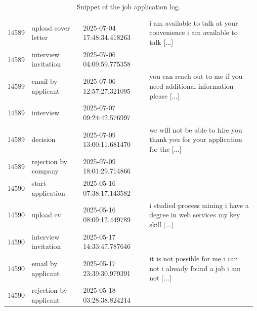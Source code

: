 \begin{appendices}
\begin{table}[!h]
\begin{tabularx}{\textwidth}{lllp{8.5cm}}
14589&upload cover letter&2025-07-04 17:48:34.418263&i am available to talk at your convenience i am available to talk   [...]\\
14589&interview invitation&2025-07-06 04:09:59.775358&\\
14589&email by applicant&2025-07-06 12:57:27.321095&you can reach out to me if you need additional information please  [...] \\
14589&interview&2025-07-07 09:24:42.576997&\\
14589&decision&2025-07-09 13:00:11.681470&we will not be able to hire you thank you for your application for the [...] \\
14589&rejection by company&2025-07-09 18:01:29.714866&\\
14590&start application&2025-05-16 07:38:17.143582&\\
14590&upload cv&2025-05-16 08:09:12.449789&i studied process mining i have a degree in web services my key skill  [...] \\
14590&interview invitation&2025-05-17 14:33:47.787646&\\
14590&email by applicant&2025-05-17 23:39:30.979391&it is not possible for me i can not i already found a job i am not  [...]\\
14590&rejection by applicant&2025-05-18 03:28:38.824214&\\
		\bottomrule	\end{tabularx}
	\caption[Snippet of the job application log]{Snippet of the job application log.}
\end{table}



\end{appendices}
